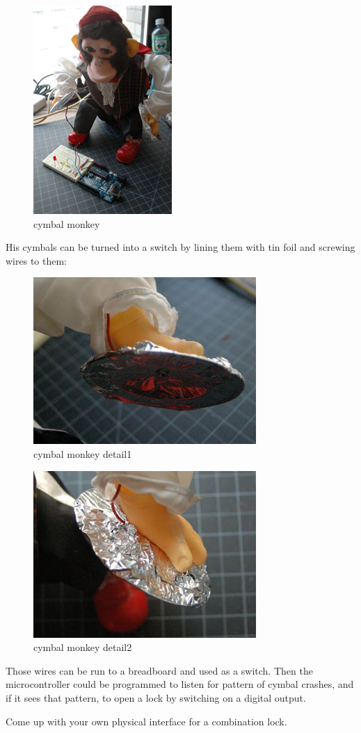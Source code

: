 \begin{figure}[!htb]
 \centering
 \includegraphics[scale=0.85]{img/digitalio/cymbal_monkey.jpg}
 \caption{cymbal monkey}
 \label{cymbal monkey}
\end{figure}

His cymbals can be turned into a switch by lining them with tin foil and screwing wires to them:

\begin{figure}[!htb]
 \centering
 \includegraphics[scale=0.85]{img/digitalio//cymbal_monkey_detail1.jpg}
 \caption{cymbal monkey detail1}
 \label{cymbal monkey detail1}
\end{figure}


\begin{figure}[!htb]
 \centering
 \includegraphics[scale=0.85]{img/digitalio//cymbal_monkey_detail2.jpg}
 \caption{cymbal monkey detail2}
 \label{cymbal monkey detail2}
\end{figure}

Those wires can be run to a breadboard and used as a switch. Then the microcontroller could be programmed to listen for pattern of cymbal crashes, and if it sees that pattern, to open a lock by switching on a digital output.

Come up with your own physical interface for a combination lock.

